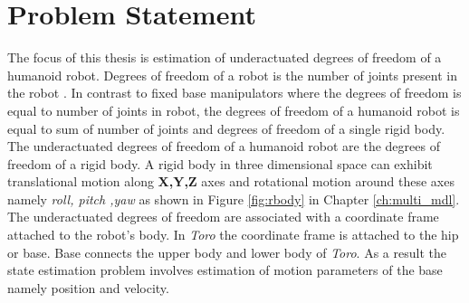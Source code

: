 \section{Problem Statement}
    The focus of this thesis is estimation of underactuated degrees of freedom of a humanoid robot.  Degrees of freedom of a robot is the number of joints present in the robot \citep{mur94}. In contrast to fixed base manipulators where the degrees of freedom is equal to number of joints in robot, the degrees of freedom of a humanoid robot is equal to sum of number of joints and degrees of freedom of a single rigid body. The underactuated degrees of freedom of a humanoid robot are the degrees of freedom of a  rigid body.  A rigid body in three dimensional space can exhibit translational motion along \textbf{X,Y,Z} axes and rotational motion around these axes namely \emph{ roll, pitch ,yaw} as shown in Figure \ref{fig:rbody} in Chapter \ref{ch:multi_mdl}. The underactuated degrees of freedom are associated with a coordinate frame attached to the robot's body. In \emph{Toro} the coordinate frame is attached to the hip or base. Base connects the upper body and lower body of \emph{Toro}. As a result the state estimation problem involves estimation of motion parameters of the base namely position and velocity.

